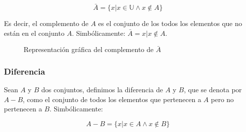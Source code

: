 \begin{equation}
    \bar{A}= \{x | x \in \mathbb U \wedge x \notin A\}
\end{equation}

Es decir, el complemento de $A$ es el conjunto de los todos los elementos que no
están en el conjunto $A$. Simbólicamente: $ \bar{A}={x | x \notin A}$.

\begin{figure}[h]
    \centering
    \caption{Representación gráfica del complemento de $\bar{A}$}
    \label{fig:unionConjuntos}
\end{figure}

\subsubsection{Diferencia}

Sean $A$ y $B$ dos conjuntos, definimos la diferencia de $A$ y $B$, que se
denota por $A-B$, como el conjunto de todos los elementos que pertenecen a $A$
pero no pertenecen a $B$. Simbólicamente:

\begin{equation}
    A-B = \{x | x \in A \land x \not\in B\}
\end{equation}

